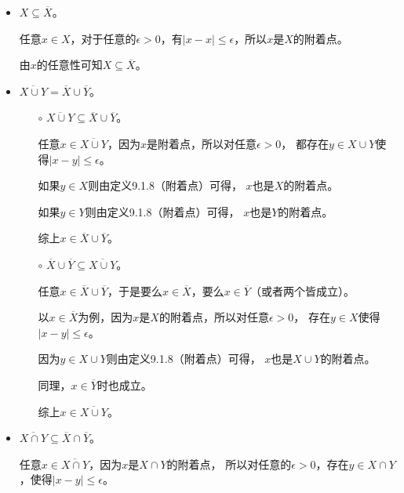 \documentclass{article}
\begin{document}
\begin{itemize}
      \item $X \subseteq  \overline{X}$。

            任意$x \in X$，对于任意的$\epsilon > 0$，有$|x - x| \leq \epsilon$，所以$x$是$X$的附着点。

            由$x$的任意性可知$X \subseteq \overline{X}$。

      \item $\overline{X \cup Y} = \overline{X} \cup \overline{Y}$。
            \begin{itemize}
                  \item[$\circ$] $\overline{X \cup Y} \subseteq \overline{X} \cup \overline{Y}$。

                        任意$x \in \overline{X \cup Y}$，因为$x$是附着点，所以对任意$\epsilon > 0$，
                        都存在$y \in X \cup Y$使得$|x - y| \leq \epsilon$。

                        如果$y \in X$则由定义9.1.8（附着点）可得，
                        $x$也是$X$的附着点。

                        如果$y \in Y$则由定义9.1.8（附着点）可得，
                        $x$也是$Y$的附着点。

                        综上$x \in \overline{X} \cup \overline{Y}$。

                  \item[$\circ$] $\overline{X} \cup \overline{Y} \subseteq \overline{X \cup Y}$。

                        任意$x \in \overline{X} \cup \overline{Y}$，于是要么$x \in \overline{X}$，要么$x \in \overline{Y}$（或者两个皆成立）。

                        以$x \in \overline{X}$为例，因为$x$是$X$的附着点，所以对任意$\epsilon > 0$，
                        存在$y \in X$使得$|x - y| \leq \epsilon$。

                        因为$y \in X \cup Y$则由定义9.1.8（附着点）可得，
                        $x$也是$X \cup Y$的附着点。

                        同理，$x \in \overline{Y}$时也成立。

                        综上$x \in \overline{X \cup Y}$。

            \end{itemize}
      \item $\overline{X \cap Y} \subseteq \overline{X} \cap \overline{Y}$。

            任意$x \in \overline{X \cap Y}$，因为$x$是$X \cap Y$的附着点，
            所以对任意的$\epsilon > 0$，存在$y \in X \cap Y$，使得$|x - y| \leq \epsilon$。


\end{itemize}
\end{document}
